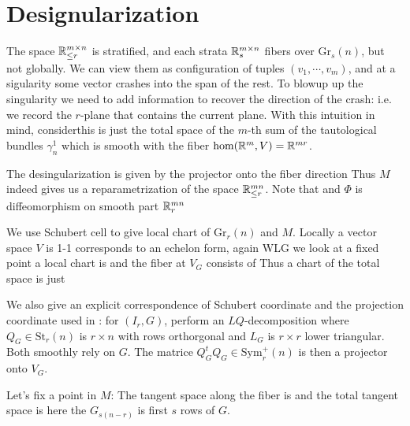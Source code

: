 \documentclass[]{note}
\begin{document}
\section{Designularization}
The space $\mathbb R_{\le r}^{m\times n}$ is stratified, and each strata $\mathbb{R}_s^{m\times n}$ fibers over $\mathrm{Gr}_s(n)$, but not globally. We can view them as configuration of tuples $(v_1,\cdots,v_m)$, and at a sigularity some vector crashes into the span of the rest. To blowup up the singularity we need to add information to recover the direction of the crash: i.e. we record the $r$-plane that contains the current plane. With this intuition in mind, considerthis is just the total space of the $m$-th sum of the tautological bundles $\gamma^1_n$  which is smooth with the fiber $\hom(\mathbb{R}^m,V)=\mathbb{R}^{mr}$.

The desingularization is given by the projector onto the fiber direction Thus $M$ indeed gives us a reparametrization of the space $\mathbb{R}_{\le r}^{mn}$.
 Note that and $\Phi$ is diffeomorphism on smooth part $\mathbb{R}_r^{mn}$


We use Schubert cell to give local chart of $\mathrm{Gr}_r(n )  $  and $M$. Locally a vector space $V$ is 1-1 corresponds to an echelon form, 
again WLG we look at a fixed point
a local chart is
and the fiber at $V_G$ consists of 
Thus a chart of the total space is just 

We also give an explicit correspondence of Schubert coordinate and the projection coordinate used in \cite{pap}: for $(I_r,G)$, perform an $LQ$-decomposition
where $Q_G\in \mathrm{St}_r(n)$ is $r\times n$ with rows orthorgonal and $L_G$ is $r\times r$ lower triangular. Both smoothly rely on $G$. The matrice $Q_G^tQ_G\in \mathrm{Sym}_r^+(n)$ is then a projector onto $V_G$.


Let's fix a point in $M$:  
The tangent space along the fiber is 
and the total tangent space is
here the $G_{s(n-r)}$ is first $s$ rows of $G$.
\end{document}
